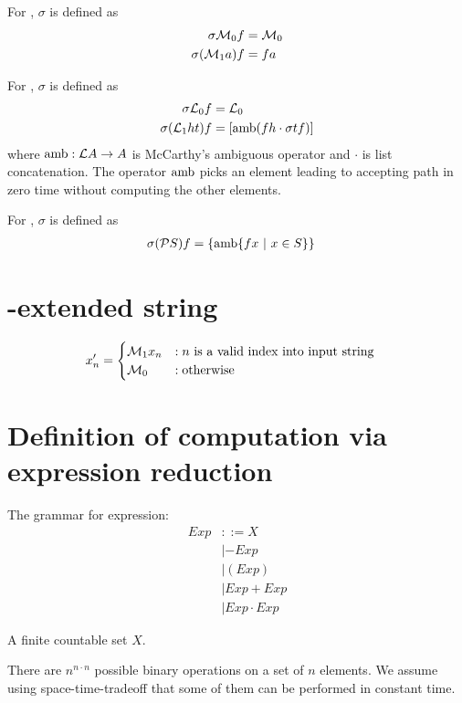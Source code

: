 For \mM, $\sigma$ is defined as
\begin{align}
    \sigma \mathcal M_0 f &= \mathcal M_0
    \\ \sigma (\mathcal M_1 a) f &= fa
\end{align}

For \mL, $\sigma$ is defined as
\begin{align}
    \sigma \mathcal L_0 f &= \mathcal L_0
    \\ \sigma (\mathcal L_1 h t) f &= [\operatorname{amb} (fh \cdot \sigma tf)]
\end{align}
where $\operatorname{amb} : \mathcal L A \to A$ is McCarthy's ambiguous operator
and $\cdot$ is list concatenation.
The operator $\operatorname{amb}$ picks an element leading to accepting path
in zero time without computing the other elements.

For \mP, $\sigma$ is defined as
\begin{align}
    \sigma (\mathcal P S) f &= \{ \operatorname{amb} \{ f x ~|~ x \in S \} \}
\end{align}

\section{\mM-extended string}

\begin{align*}
    x_n' &= \begin{cases}
 \mathcal M_1 x_n &: n \text{ is a valid index into input string}
  \\ \mathcal M_0 &: \text{otherwise}
\end{cases}
\end{align*}

\section{Definition of computation via expression reduction}

The grammar for expression:
\begin{align}
    Exp &::= X
      \\ &| -Exp
      \\ &| (Exp)
      \\ &| Exp + Exp
      \\ &| Exp \cdot Exp
\end{align}

A finite countable set $X$.

There are $n^{n \cdot n}$ possible binary operations on a set of $n$ elements.
We assume using space-time-tradeoff that some of them can be performed in constant time.

